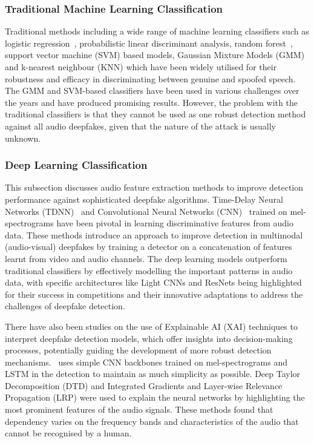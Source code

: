 \documentclass{Interspeech}
\begin{document}
\subsubsection{Traditional Machine Learning Classification}
Traditional methods including a wide range of machine learning classifiers such
as logistic regression~\cite{10.1007/978-3-030-61702-8_1}, probabilistic linear
discriminant analysis, random forest~\cite{ji2017ensemble}, support vector
machine (SVM) based models, Gaussian Mixture Models (GMM)\cite{ASVspoof_21} and
k-nearest neighbour (KNN) which have been widely utilised for their robustness
and efficacy in discriminating between genuine and spoofed speech. The GMM and
SVM-based classifiers have been used in various challenges over the years and
have produced promising results. However, the problem with the traditional
classifiers is that they cannot be used as one robust detection method against
all audio deepfakes, given that the nature of the attack is usually unknown.

\subsubsection{Deep Learning Classification}
This subsection discusses audio feature extraction methods to improve detection
performance against sophisticated deepfake algorithms. Time-Delay Neural
Networks (TDNN)~\cite{multimodal_df_detection} and Convolutional Neural
Networks (CNN)~\cite{xai_detection} trained on mel-spectrograms have been
pivotal in learning discriminative features from audio data. These methods
introduce an approach to improve detection in multimodal (audio-visual)
deepfakes by training a detector on a concatenation of features learnt from
video and audio channels. The deep learning models outperform traditional
classifiers by effectively modelling the important patterns in audio data, with
specific architectures like Light CNNs and ResNets being highlighted for their
success in competitions and their innovative adaptations to address the
challenges of deepfake detection.

There have also been studies on the use of Explainable AI (XAI) techniques to
interpret deepfake detection models, which offer insights into decision-making
processes, potentially guiding the development of more robust detection
mechanisms.~\cite{xai_detection} uses simple CNN backbones trained on
mel-spectrograms and LSTM in the detection to maintain as much simplicity as
possible. Deep Taylor Decomposition (DTD) and Integrated Gradients and
Layer-wise Relevance Propagation (LRP) were used to explain the neural networks
by highlighting the most prominent features of the audio signals. These methods
found that dependency varies on the frequency bands and characteristics of the
audio that cannot be recognised by a human.
\end{document}

